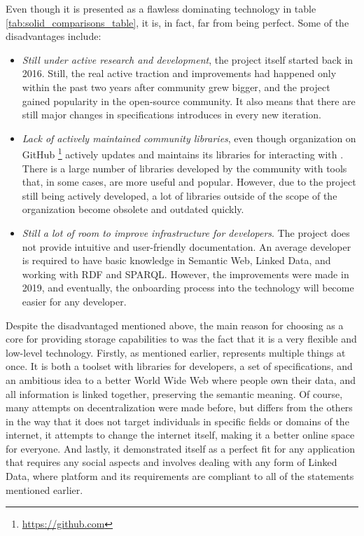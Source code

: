 Even though it is presented as a flawless dominating technology in table \ref{tab:solid_comparisons_table}, it is, in fact, far from being perfect. Some of the disadvantages include:
\begin{itemize}
    \item \textit{Still under active research and development}, the project itself started back in 2016. Still, the real active traction and improvements had happened only within the past two years after community grew bigger, and the project gained popularity in the open-source community. It also means that there are still major changes in specifications introduces in every new iteration.
    \item \textit{Lack of actively maintained community libraries}, even though \solid{} organization on GitHub \footnote{\url{https://github.com}} actively updates and maintains its libraries for interacting with \solid{}. There is a large number of libraries developed by the community with tools that, in some cases, are more useful and popular. However, due to the \solid{} project still being actively developed, a lot of libraries outside of the scope of the organization become obsolete and outdated quickly.
    \item \textit{Still a lot of room to improve infrastructure for developers}. The project does not provide intuitive and user-friendly documentation. An average developer is required to have basic knowledge in Semantic Web, Linked Data, and working with RDF and SPARQL. However, the improvements were made in 2019, and eventually, the onboarding process into the technology will become easier for any developer.
\end{itemize}

Despite the disadvantaged mentioned above, the main reason for choosing \solid{} as a core for providing storage capabilities to \lpa{} was the fact that it is a very flexible and low-level technology.  Firstly,  as mentioned earlier, \solid{} represents multiple things at once. It is both a toolset with libraries for developers, a set of specifications, and an ambitious idea to a better World Wide Web where people own their data, and all information is linked together, preserving the semantic meaning. Of course, many attempts on decentralization were made before, but \solid{} differs from the others in the way that it does not target individuals in specific fields or domains of the internet, it attempts to change the internet itself, making it a better online space for everyone. And lastly, it demonstrated itself as a perfect fit for any application that requires any social aspects and involves dealing with any form of Linked Data, where \lpa{} platform and its requirements are compliant to all of the statements mentioned earlier.